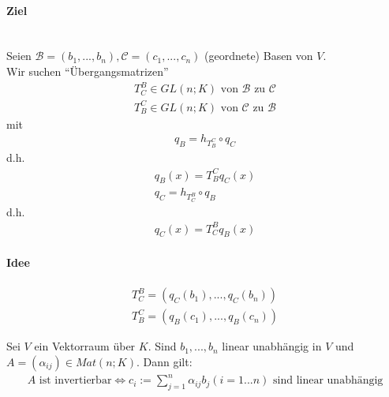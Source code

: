 \documentclass[11pt]{report}
\begin{document}
\paragraph{Ziel} {\ \\}
Seien $\mathcal{B} = (b_1, ..., b_n), \mathcal{C} = (c_1, ..., c_n)$ (geordnete) Basen von $V$. \\
Wir suchen ``Übergangsmatrizen''
\begin{align}
T^{B}_{C} \in GL(n;K) \text{ von } \mathcal{B} \text{ zu } \mathcal{C} \\
T^{C}_{B} \in GL(n;K) \text{ von } \mathcal{C} \text{ zu } \mathcal{B}
\end{align}
mit
\begin{align}
q_B = h_{T^{C}_{B}} \circ q_C
\end{align}
d.h.
\begin{align}
q_B(x) = T^{C}_{B} q_C(x) \\
q_C = h_{T^{B}_{C}} \circ q_B
\end{align}
d.h.
\begin{align}
q_C(x) = T^{B}_{C} q_B(x)
\end{align}

\paragraph{Idee}
\begin{align}
T^{B}_{C} = (q_C(b_1), ..., q_C(b_n)) \\
T^{C}_{B} = (q_B(c_1), ..., q_B(c_n))
\end{align}

\begin{lemma}
\label{lemma541}
Sei $V$ ein Vektorraum über $K$. Sind $b_1, ..., b_n$ linear unabhängig in $V$ und $A=(\alpha_{ij}) \in Mat(n;K)$. Dann gilt:
\begin{align}
A \text{ ist invertierbar} \Leftrightarrow c_i := \sum_{j=1}^{n} \alpha_{ij} b_j (i = 1...n) \text{ sind linear unabhängig}
\end{align}
\end{lemma}
\end{document}
